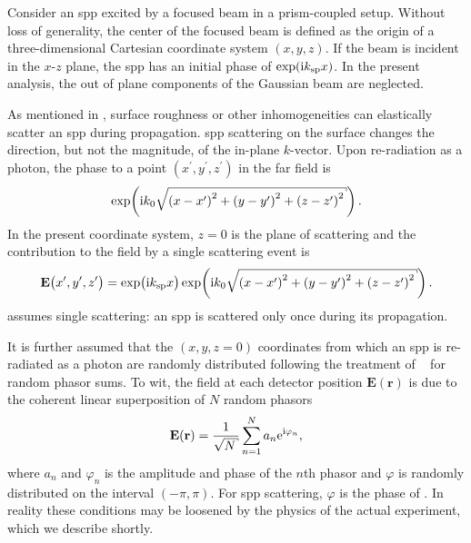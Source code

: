 Consider an \gls{spp} excited by a focused beam in a prism-coupled setup.  Without
loss of generality, the center of the focused beam is defined as the origin
of a three-dimensional Cartesian coordinate system $(x,y,z)$.  If the beam is
incident in the $x$-$z$ plane, the \gls{spp} has an initial phase of $\exp({\mathrm{i}} k_\mathrm{sp}
  x)$.  In the present analysis, the out of plane components of the Gaussian
beam are neglected.

As mentioned in , surface roughness or other
inhomogeneities can elastically scatter an \gls{spp} during propagation.  \gls{spp}
scattering on the surface changes the direction, but not the magnitude, of the
in-plane $k$-vector.  Upon re-radiation as a photon, the phase to a point
$(x^\prime,y^\prime,z^\prime)$ in the far field is
\begin{equation}
  \exp\!\left(\mi k_0 \sqrt{{(x-x^\prime)}^2 + {(y-y^\prime)}^2 + {(z-z^\prime)}^2}\right).
\end{equation}
In the present coordinate system, $z=0$ is the plane of scattering and the
contribution to the field by a single scattering event is
\begin{equation}
  \mathbf{E}\big(x^\prime,y^\prime,z^\prime\big)=\exp\!\big( \mi \ksp x \big)
  \exp\!\left(\mi k_0 \sqrt{{(x-x^\prime)}^2 + {(y-y^\prime)}^2 + {(z-z^\prime)}^2}\right).
  \label{eqn:sppsinglescattering}
\end{equation}
 assumes single scattering: an
\gls{spp} is scattered only once during its propagation.

It is further assumed that the $(x,y,z=0)$ coordinates from which an \gls{spp} is
re-radiated as a photon are randomly distributed following the treatment of
~\cite{goodman2007speckle} for random phasor sums.  To wit, the
field at each detector position $\mathbf{E}(\mathbf{r})$ is due to the
coherent linear superposition of $N$ random phasors
\begin{equation}
  \mathbf{E}(\mathbf{r}) = \frac{1}{\sqrt{N}} \sum_{n=1}^{N} a_n \me^{\mi \varphi_n},
  \label{eqn:phasorsum}
\end{equation}
where $a_n$ and $\varphi_n$ is the amplitude and phase of the $n$th phasor
and $\varphi$ is randomly distributed on the interval $(-\pi,\pi)$.  For
\gls{spp} scattering, $\varphi$ is the phase of .
In reality these conditions may be loosened by the physics of the actual
experiment, which we describe shortly.

